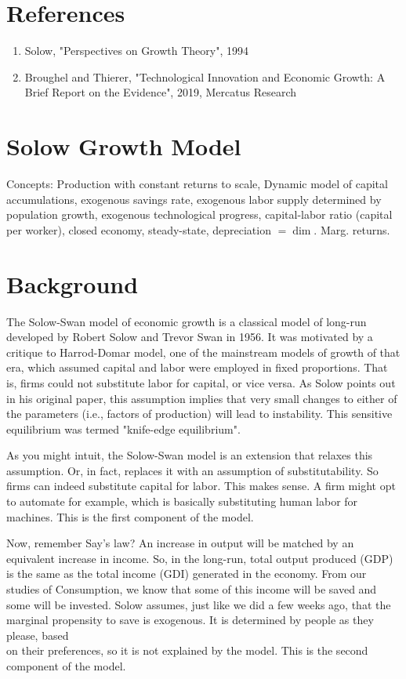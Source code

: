 \documentclass[10pt]{article}
\begin{document}
\section*{References}
\begin{enumerate}
  \item Solow, "Perspectives on Growth Theory", 1994
  \item Broughel and Thierer, "Technological Innovation and Economic Growth: A Brief Report on the Evidence", 2019, Mercatus Research
\end{enumerate}

\section*{Solow Growth Model}
Concepts: Production with constant returns to scale, Dynamic model of capital accumulations, exogenous savings rate, exogenous labor supply determined by population growth, exogenous technological progress, capital-labor ratio (capital per worker), closed economy, steady-state, depreciation $=\operatorname{dim}$. Marg. returns.

\section*{Background}
The Solow-Swan model of economic growth is a classical model of long-run developed by Robert Solow and Trevor Swan in 1956. It was motivated by a critique to Harrod-Domar model, one of the mainstream models of growth of that era, which assumed capital and labor were employed in fixed proportions. That is, firms could not substitute labor for capital, or vice versa. As Solow points out in his original paper, this assumption implies that very small changes to either of the parameters (i.e., factors of production) will lead to instability. This sensitive equilibrium was termed "knife-edge equilibrium".

As you might intuit, the Solow-Swan model is an extension that relaxes this assumption. Or, in fact, replaces it with an assumption of substitutability. So firms can indeed substitute capital for labor. This makes sense. A firm might opt to automate for example, which is basically substituting human labor for machines. This is the first component of the model.

Now, remember Say's law? An increase in output will be matched by an equivalent increase in income. So, in the long-run, total output produced (GDP) is the same as the total income (GDI) generated in the economy. From our studies of Consumption, we know that some of this income will be saved and some will be invested. Solow assumes, just like we did a few weeks ago, that the marginal propensity to save is exogenous. It is determined by people as they please, based\\
on their preferences, so it is not explained by the model. This is the second component of the model.
\end{document}
